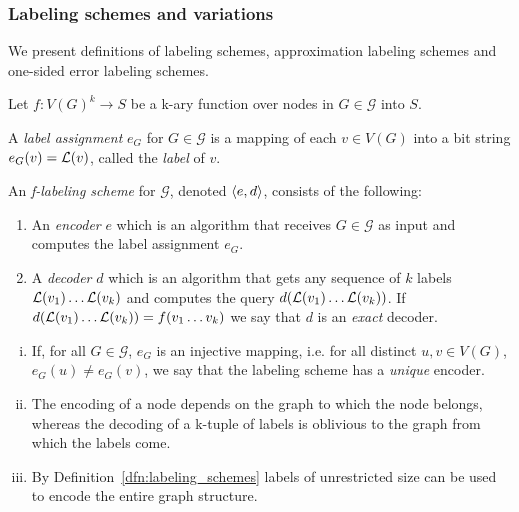 \subsubsection{Labeling schemes and variations} 
We present definitions of labeling schemes, approximation labeling schemes and one-sided error labeling schemes.			
\begin{definition}\label{dfn:labeling_schemes}
Let $f : V(G)^k  \rightarrow S$ be a k-ary function  over nodes in  $G \in \mathcal{G}$ into $S$.


A \emph{label assignment} $e_G$  for $G \in \mathcal{G}$ is a mapping of each $v \in V(G)$ into a bit  string $e_G(v)=  \mathcal{L}(v)$, called  the \emph{label} of $v$. 

An  \emph{f-labeling scheme} for  $\mathcal{G}$, denoted  $\left \langle e,d \right \rangle $,  consists   of the  following:
	\begin{enumerate}
		\item An \emph{encoder} $e$ which is an algorithm that  receives  $G \in \mathcal{G}$ as input and  computes the label assignment $e_G$. 
		 \item A \emph{decoder}  $d$ which is an algorithm  that  gets  any sequence of $k$ labels  $ \mathcal{L}(v_1)\dots  \mathcal{L}(v_k)$  and computes the query $d( \mathcal{L}(v_1)\dots  \mathcal{L}(v_k))$.
		 If  $d( \mathcal{L}(v_1)\dots  \mathcal{L}(v_k))=f(v_1\dots v_k)$ we say that $d$ is an \emph{exact} decoder.
	\end{enumerate}
\end{definition}

\begin{remark}  \label{remark:unique}\mbox{}
		\begin{enumerate}[i.]
			\item If, for all $G \in \mathcal{G}$, $e_G$ is an injective mapping, i.e. for all distinct $u,v \in V(G)$, $e_G(u) \neq e_G(v) $, we say that the labeling scheme has a \emph{unique} encoder.
			\item The encoding of a node depends on the graph to which the node belongs, whereas the decoding of a k-tuple of labels is oblivious to the graph from which the labels come.
			\item By Definition~\ref{dfn:labeling_schemes} labels of unrestricted size can be used to encode the entire graph structure.
		
		\end{enumerate}
\end{remark}



